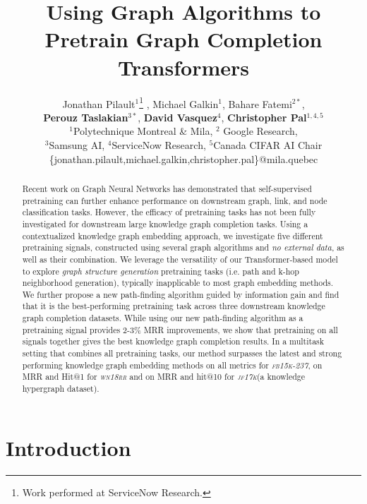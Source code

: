 \documentclass{article}
\title{Using Graph Algorithms to Pretrain Graph Completion Transformers}
\author{Jonathan Pilault$^{1}$\footnote{ Work performed at ServiceNow Research.} , Michael Galkin$^{1}$, Bahare Fatemi$^{2*}$, \\
\textbf{Perouz Taslakian}$^{3*}$, \textbf{David Vasquez}$^{4}$, \textbf{Christopher Pal}$^{1,4,5}$ \\
\affiliations
$^1$Polytechnique Montreal \& Mila, $^2$ Google Research, \\
$^3$Samsung AI, $^4$ServiceNow Research, $^5$Canada CIFAR AI Chair \\
\emails\{jonathan.pilault,michael.galkin,christopher.pal\}@mila.quebec
}
\newcommand{\wnrr}{\textsl{\textsc{wn18rr}}\xspace}
\newcommand{\fb}{\textsl{\textsc{fb15k-237}}\xspace}
\newcommand{\jf}{\textsl{\textsc{jf17k}}\xspace}
\begin{document}
\maketitle

\begin{abstract}
Recent work on Graph Neural Networks has demonstrated that self-supervised pretraining can further enhance performance on downstream graph, link, and node classification tasks. 
However, the efficacy of pretraining tasks has not been fully investigated for downstream large knowledge graph completion tasks.
Using a contextualized knowledge graph embedding approach, we investigate five different pretraining signals, constructed using several graph algorithms and \emph{no external data}, as well as their combination.
We leverage the versatility of our Transformer-based model to explore \emph{graph structure generation} pretraining tasks (i.e. path and k-hop neighborhood generation), typically inapplicable to most graph embedding methods.
We further propose a new path-finding algorithm guided by information gain and find that it is the best-performing pretraining task across three downstream knowledge graph completion datasets.
While using our new path-finding algorithm as a pretraining signal provides 2-3\% MRR improvements, we show that pretraining on all signals together gives the best knowledge graph completion results.
In a multitask setting that combines all pretraining tasks, our method surpasses the latest and strong performing knowledge graph embedding methods on all metrics for \fb, on MRR and Hit@1 for \wnrr and on MRR and hit@10 for \jf (a knowledge hypergraph dataset).

\end{abstract}

\section{Introduction}
\label{sec:intro}

\end{document}

